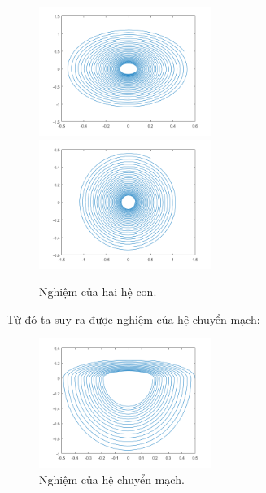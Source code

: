 \documentclass[14pt,a4paper,oneside]{report}		%
\theoremstyle{definition}
\begin{document}
\begin{figure}[h]
\includegraphics[width=0.5\textwidth]{graph1.png}
\hspace{\fill}
\includegraphics[width=0.5\textwidth]{graph2.png}
\caption{Nghiệm của hai hệ con.}\label{fig:1}
\end{figure}

Từ đó ta suy ra được nghiệm của hệ chuyển mạch:
\begin{figure}[h]
\centering
\includegraphics[width=0.5\textwidth]{graph3.png}
\caption{Nghiệm của hệ chuyển mạch.}\label{fig:2}
\end{figure}
\newpage
\end{document}
